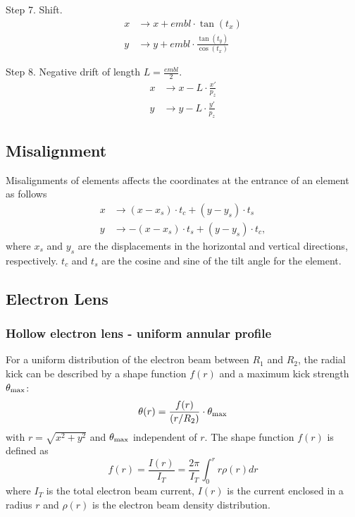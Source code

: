 Step 7. Shift.
\begin{align*}
    x &\to x + embl\cdot \tan(t_x) \\
    y &\to y + embl\cdot\frac{\tan(t_y)}{\cos(t_x)}
\end{align*}

Step 8. Negative drift of length $L=\frac{embl}{2}$.
\begin{align*}
    x &\to x - L\cdot \frac{x'}{p_z} \\
    y &\to y - L\cdot \frac{y'}{p_z}
\end{align*}


\subsection{Misalignment}

Misalignments of elements affects the coordinates at the entrance of an
element as follows
\begin{align*}
    x &\to (x-x_s)\cdot t_c + (y-y_s)\cdot t_s \\
    y &\to -(x-x_s)\cdot t_s + (y-y_s)\cdot t_c,
\end{align*}
where $x_s$ and $y_s$ are the displacements in the horizontal and vertical
directions, respectively. $t_c$ and $t_s$ are the cosine and sine of the tilt
angle for the element.

\subsection{Electron Lens}
\label{elense}
\subsubsection{Hollow electron lens - uniform annular profile}
For a uniform distribution of the electron beam between $R_1$ and $R_2$, the radial kick can be described by a shape function $f(r)$ and a maximum kick strength $\theta_{\rm max}$:
\begin{equation}
\theta(r)=\frac{f(r)}{(r/R_2)}\cdot \theta_{\rm max}
\end{equation}
with $r=\sqrt{x^2+y^2}$ and $\theta_{\rm max}$ independent of $r$. The shape function $f(r)$ is defined as
\begin{equation}
f(r) = \frac{I(r)}{I_T}=\frac{2\pi}{I_T}\int_{0}^r r\rho(r) dr
\end{equation}
where $I_T$ is the total electron beam current, $I(r)$ is the current enclosed in a radius $r$ and $\rho(r)$ is the electron beam density distribution.


